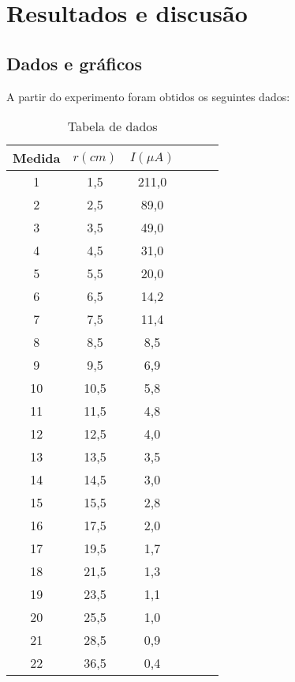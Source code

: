 \documentclass [a4paper, 12pt]{article}
\begin{document}
\section{Resultados e discusão}

\subsection{Dados e gráficos}

A partir do experimento foram obtidos os seguintes dados:

\begin{table}[h]
\centering
\caption{Tabela de dados}
\vspace{0.5cm}
\begin{tabular}{|c|c|c|c|c|c|} \hline
Medida & $r(cm)$ & $I(\mu A)$  \\ %
\hline                               %
1  & 1,5       & 211,0  \\  \hline 
2  & 2,5       & 89,0  \\  \hline
3  & 3,5       & 49,0  \\  \hline
4  & 4,5       & 31,0  \\ \hline
5  & 5,5       & 20,0  \\ \hline
6  & 6,5       & 14,2  \\ \hline
7  & 7,5       & 11,4  \\ \hline
8  & 8,5       & 8,5   \\ \hline
9  & 9,5       & 6,9   \\ \hline
10 & 10,5      & 5,8   \\ \hline
11 & 11,5      & 4,8   \\ \hline
12 & 12,5      & 4,0   \\ \hline
13 & 13,5      & 3,5   \\ \hline
14 & 14,5      & 3,0   \\ \hline
15 & 15,5      & 2,8   \\ \hline
16 & 17,5      & 2,0   \\ \hline
17 & 19,5      & 1,7   \\ \hline
18 & 21,5      & 1,3   \\ \hline
19 & 23,5      & 1,1   \\ \hline
20 & 25,5      & 1,0   \\ \hline
21 & 28,5      & 0,9   \\ \hline
22 & 36,5      & 0,4   \\ \hline %
\end{tabular}
\end{table}
\end{document}
